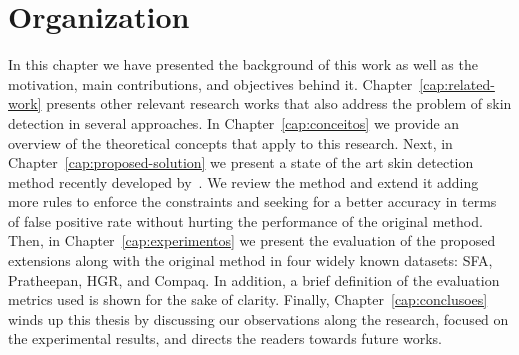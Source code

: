 \section{Organization}
\label{sec:text_organization}
In this chapter we have presented the background of this work as well as the motivation, main contributions, and objectives behind it. Chapter~\ref{cap:related-work} presents other relevant research works that also address the problem of skin detection in several approaches. In Chapter~\ref{cap:conceitos} we provide an overview of the theoretical concepts that apply to this research. Next, in Chapter~\ref{cap:proposed-solution} we present a state of the art skin detection method recently developed by~\citet{brancati:17}. We review the method and extend it adding more rules to enforce the constraints and seeking for a better accuracy in terms of false positive rate without hurting the performance of the original method. Then, in Chapter~\ref{cap:experimentos} we present the evaluation of the proposed extensions along with the original method in four widely known datasets: SFA, Pratheepan, HGR, and Compaq. In addition, a
brief definition of the evaluation metrics used is shown for the sake of clarity. Finally, Chapter~\ref{cap:conclusoes} winds up this thesis by discussing our observations along the research, focused on the experimental results, and directs the readers towards future works.